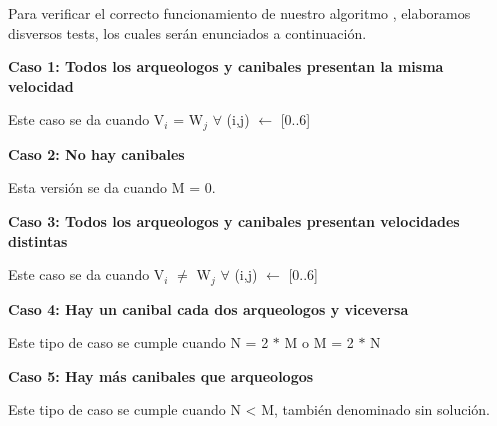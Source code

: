 \indent Para verificar el correcto funcionamiento de nuestro algoritmo , elaboramos disversos tests,
los cuales ser\'an enunciados a continuaci\'on.\\

\begin{center}
 \textbf{Caso 1: Todos los arqueologos y canibales presentan la misma velocidad}
\end{center}

Este caso se da cuando V$_{i}$ = W$_{j}$ $\forall$ (i,j)  $\gets$ [0..6] \\

 
 \begin{center}
 \textbf{Caso 2: No hay canibales}
\end{center}

Esta versi\'on se da cuando M = 0.


\begin{center}
 \textbf{Caso 3: Todos los arqueologos y canibales presentan velocidades distintas}
\end{center}

Este caso se da cuando V$_{i}$ $\neq$ W$_{j}$ $\forall$ (i,j)  $\gets$ [0..6] 


\begin{center}
 \textbf{Caso 4: Hay un canibal cada dos arqueologos y viceversa}
\end{center}

Este tipo de caso se cumple cuando N = 2 $\ast$ M o M = 2 $\ast$ N


\begin{center}
 \textbf{Caso 5: Hay m\'as canibales que arqueologos}
\end{center}

Este tipo de caso se cumple cuando N < M, tambi\'en denominado sin soluci\'on.  


